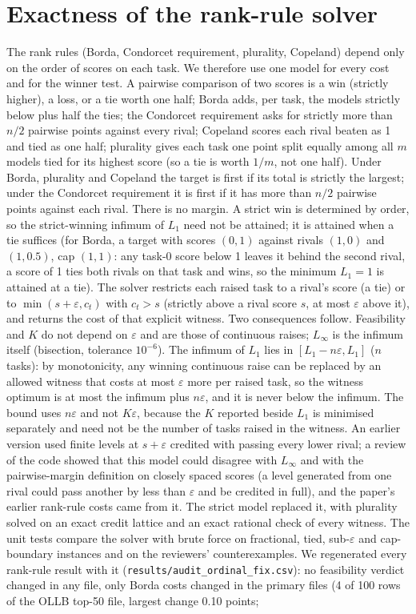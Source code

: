 \documentclass{article}
\begin{document}
\section{Exactness of the rank-rule solver}
\label{app:ordinal}
The rank rules (Borda, Condorcet requirement, plurality, Copeland) depend only on the order of scores on each task. We therefore use one model for every cost and for the winner test. A pairwise comparison of two scores is a win (strictly higher), a loss, or a tie worth one half; Borda adds, per task, the models strictly below plus half the ties; the Condorcet requirement asks for strictly more than $n/2$ pairwise points against every rival; Copeland scores each rival beaten as 1 and tied as one half; plurality gives each task one point split equally among all $m$ models tied for its highest score (so a tie is worth $1/m$, not one half). Under Borda, plurality and Copeland the target is first if its total is strictly the largest; under the Condorcet requirement it is first if it has more than $n/2$ pairwise points against each rival. There is no margin. A strict win is determined by order, so the strict-winning infimum of $L_1$ need not be attained; it is attained when a tie suffices (for Borda, a target with scores $(0,1)$ against rivals $(1,0)$ and $(1,0.5)$, cap $(1,1)$: any task-0 score below 1 leaves it behind the second rival, a score of 1 ties both rivals on that task and wins, so the minimum $L_1=1$ is attained at a tie). The solver restricts each raised task to a rival's score (a tie) or to $\min(s+\varepsilon,c_t)$ with $c_t>s$ (strictly above a rival score $s$, at most $\varepsilon$ above it), and returns the cost of that explicit witness. Two consequences follow. Feasibility and $K$ do not depend on $\varepsilon$ and are those of continuous raises; $L_\infty$ is the infimum itself (bisection, tolerance $10^{-6}$). The infimum of $L_1$ lies in $[L_1-n\varepsilon,L_1]$ ($n$ tasks): by monotonicity, any winning continuous raise can be replaced by an allowed witness that costs at most $\varepsilon$ more per raised task, so the witness optimum is at most the infimum plus $n\varepsilon$, and it is never below the infimum. The bound uses $n\varepsilon$ and not $K\varepsilon$, because the $K$ reported beside $L_1$ is minimised separately and need not be the number of tasks raised in the witness. An earlier version used finite levels at $s+\varepsilon$ credited with passing every lower rival; a review of the code showed that this model could disagree with $L_\infty$ and with the pairwise-margin definition on closely spaced scores (a level generated from one rival could pass another by less than $\varepsilon$ and be credited in full), and the paper's earlier rank-rule costs came from it. The strict model replaced it, with plurality solved on an exact credit lattice and an exact rational check of every witness. The unit tests compare the solver with brute force on fractional, tied, sub-$\varepsilon$ and cap-boundary instances and on the reviewers' counterexamples. We regenerated every rank-rule result with it (\texttt{results/audit\_ordinal\_fix.csv}): no feasibility verdict changed in any file, only Borda costs changed in the primary files (4 of 100 rows of the OLLB top-50 file, largest change 0.10 points; 
\end{document}
